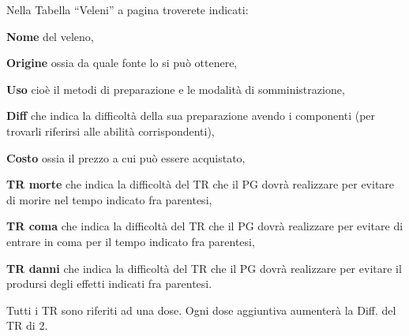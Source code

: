 Nella Tabella ``Veleni'' a pagina \pageref{tabveleni} troverete indicati: 

\begin{description}
\item{  \textbf{Nome}} del veleno,
\item{  \textbf{Origine}} ossia da quale fonte lo si pu\`o ottenere,
\item{ \textbf{Uso}} cio\`e il metodi di preparazione e le modalit\`a di
  somministrazione,
\item{\textbf{Diff}} che indica la difficolt\`a della sua preparazione avendo
  i componenti (per trovarli riferirsi alle abilit\`a
  corrispondenti),
\item{\textbf{Costo}} ossia il prezzo a cui pu\`o essere acquistato,
\item{\textbf{TR morte}} che indica la difficolt\`a del TR che il PG
  dovr\`a realizzare per evitare di morire nel tempo indicato fra
  parentesi,
\item{\textbf{TR coma}} che indica la difficolt\`a del TR che il PG
  dovr\`a realizzare per evitare di entrare in coma per il tempo
  indicato fra parentesi,
\item{\textbf{TR danni}} che indica la difficolt\`a del TR che il PG
  dovr\`a realizzare per evitare il prodursi degli effetti indicati
  fra parentesi.
\end{description}

Tutti i TR sono riferiti ad una dose.  Ogni dose aggiuntiva
aumenter\`a la Diff. del TR di 2.  




